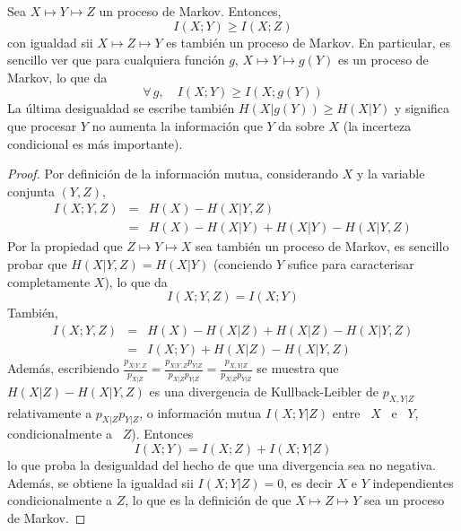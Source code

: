 \begin{teorema}
  Sea  $X \mapsto  Y \mapsto  Z$ un  proceso de  Markov. Entonces,
  \[
  I(X;Y) \ge I(X;Z)
  \]
  con igualdad sii $X \mapsto Z \mapsto Y$ es tambi\'en un proceso de Markov. En
  particular, es  sencillo ver  que para cualquiera  funci\'on $g$, $X  \mapsto Y
  \mapsto g(Y)$ es un proceso de Markov,  lo que da
  \[
  \forall \, g, \quad I(X;Y) \ge I(X;g(Y))
  \]
  La  \'ultima  desigualdad  se  escribe  tambi\'en  $H(X|g(Y))  \ge  H(X|Y)$  y
  significa que  procesar $Y$ no aumenta  la informaci\'on que $Y$  da sobre $X$
  (la incerteza condicional es m\'as importante).
\end{teorema}
%
\begin{proof}
  Por definici\'on  de la  informaci\'on mutua, considerando  $X$ y  la variable
  conjunta $(Y,Z)$,
%
\begin{eqnarray*}
I(X ; Y,Z) & = & H(X) - H(X|Y,Z)\\[2.5mm]
%
& = & H(X) - H(X|Y) + H(X|Y) - H(X|Y,Z)
\end{eqnarray*}
%
\noindent Por la propiedad que $Z  \mapsto Y \mapsto X$ sea tambi\'en un proceso
de Markov, es sencillo probar que $H(X|Y,Z) = H(X|Y)$ (conciendo $Y$ sufice para
caracterisar completamente $X$), lo que da
%
\[
I(X;Y,Z) = I(X;Y)
\]
%
Tambi\'en,
%
\begin{eqnarray*}
I(X ; Y,Z) & = & H(X) - H(X|Z) + H(X|Z) - H(X|Y,Z)\\[2.5mm]
%
& = & I(X;Y) + H(X|Z) - H(X|Y,Z)
\end{eqnarray*}
%
\noindent  Adem\'as,   escribiendo  $\frac{p_{X|Y,Z}}{p_{X|Z}}  =  \frac{p_{X|Y,Z}
  p_{Y|Z}}{p_{X|Z} p_{Y|Z}} = \frac{p_{X,Y|Z}}{p_{X|Z} p_{Y|Z}}$
%
se muestra  que $H(X|Z)  - H(X|Y,Z)$ es  una divergencia de  Kullback-Leibler de
$p_{X,Y|Z}$ relativamente a $p_{X|Z}  p_{Y|Z}$, o informaci\'on mutua $I(X;Y|Z)$
entre \ $X$ \ e \ $Y$,  condicionalmente a \ $Z$).  Entonces
%
\[
I(X;Y) = I(X;Z) + I(X;Y|Z)
\]
%
lo  que  proba  la  desigualdad  del   hecho  de  que  una  divergencia  sea  no
negativa. Adem\'as, se obtiene la igualdad sii  $I(X;Y|Z) = 0$, es decir $X$ e $Y$
independientes  condicionalmente a  $Z$, lo  que es  la definici\'on  de  que $X
\mapsto Z \mapsto Y$ sea un proceso de Markov.
\end{proof}

